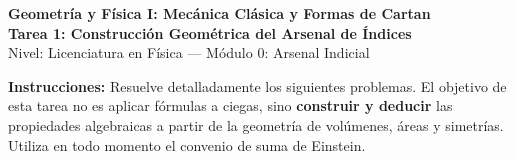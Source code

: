 \documentclass[11pt,letterpaper]{article}
\begin{document}
\setlength{\abovedisplayskip}{6pt}
\setlength{\belowdisplayskip}{6pt}
\setlength{\textfloatsep}{10pt}
\setlength{\intextsep}{8pt}
\color{blackmain}

\begin{center}
{\LARGE\textbf{Geometría y Física I: Mecánica Clásica y Formas de Cartan}}\\[0.25cm]
{\Large\textcolor{orangeacc}{\textbf{Tarea 1: Construcción Geométrica del Arsenal de Índices}}}\\[0.2cm]
{\large\textcolor{graymuted}{Nivel: Licenciatura en Física --- Módulo 0: Arsenal Indicial}}\\[0.25cm]
\end{center}

\vspace{0.2cm}

\noindent\textbf{Instrucciones:} Resuelve detalladamente los siguientes problemas. El objetivo de esta tarea no es aplicar fórmulas a ciegas, sino \textbf{construir y deducir} las propiedades algebraicas a partir de la geometría de volúmenes, áreas y simetrías. Utiliza en todo momento el convenio de suma de Einstein.

\end{document}
